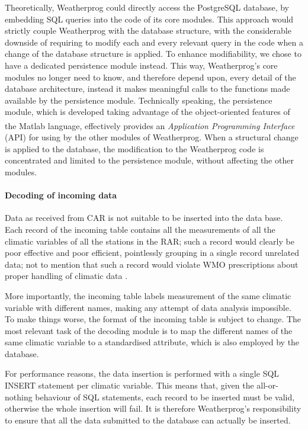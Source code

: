 \documentclass[authoryear,preprint,review,12pt]{elsarticle}
\begin{document}
Theoretically, Weatherprog could directly access the PostgreSQL database, by embedding SQL queries into the code of its core modules. This approach would strictly couple Weatherprog with the database structure, with the considerable downside of requiring to modify each and every relevant query in the code when a change of the database structure is applied. To enhance modifiability, we chose to have a dedicated persistence module instead. This way, Weatherprog's core modules no longer need to know, and therefore depend upon, every detail of the database architecture, instead it makes meaningful calls to the functions made available by the persistence module. Technically speaking, the persistence module, which is developed taking advantage of the object-oriented features of the Matlab\textsuperscript{\circledR} language, effectively provides an \emph{Application Programming Interface} (API) for using by the other modules of Weatherprog. When a structural change is applied to the database, the modification to the Weatherprog code is concentrated and limited to the persistence module, without affecting the other modules.

 \paragraph{Decoding of incoming data} Data as received from CAR is not suitable to be inserted into the data base. Each record of the incoming table contains all the measurements of all the climatic variables of all the stations in the RAR; such a record would clearly be poor effective and poor efficient, pointlessly grouping in a single record unrelated data; not to mention that such a record would violate WMO prescriptions about proper handling of climatic data \citep{wcdmp:cdms}.
 
 More importantly, the incoming table labels measurement of the same climatic variable with different names, making any attempt of data analysis impossible. To make things worse, the format of the incoming table is subject to change. The most relevant task of the decoding module is to map the different names of the same climatic variable to a standardised attribute, which is also employed by the database.
 
 For performance reasons, the data insertion is performed with a single SQL INSERT statement per climatic variable. This means that, given the all-or-nothing behaviour of SQL statements, each record to be inserted must be valid, otherwise the whole insertion will fail. It is therefore Weatherprog's responsibility to ensure that all the data submitted to the database can actually be inserted.
 
\end{document}
